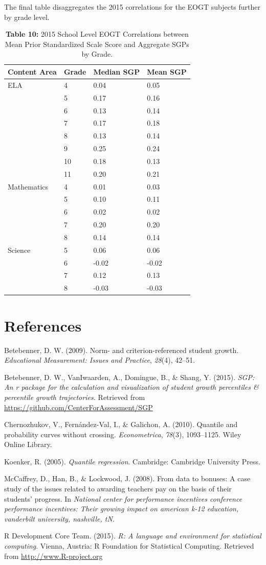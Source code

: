 \documentclass[12pt]{article}
\begin{document}
The final table disaggregates the 2015 correlations for the EOGT
subjects further by grade level.

\begin{table}[H]
\caption*{\textbf{Table 10:} 2015 School Level EOGT Correlations between Mean Prior Standardized Scale Score and Aggregate SGPs by Grade.\label{table10}} 
\begin{center}
\begin{tabular}{llll}
\hline\hline
\multicolumn{1}{c}{Content Area}&\multicolumn{1}{c}{Grade}&\multicolumn{1}{c}{Median SGP}&\multicolumn{1}{c}{Mean SGP}\tabularnewline
\hline
ELA& 4& 0.04& 0.05\tabularnewline
& 5& 0.17& 0.16\tabularnewline
& 6& 0.13& 0.14\tabularnewline
& 7& 0.17& 0.18\tabularnewline
& 8& 0.13& 0.14\tabularnewline
& 9& 0.25& 0.24\tabularnewline
&10& 0.18& 0.13\tabularnewline
&11& 0.20& 0.21\tabularnewline
Mathematics& 4& 0.01& 0.03\tabularnewline
& 5& 0.10& 0.11\tabularnewline
& 6& 0.02& 0.02\tabularnewline
& 7& 0.20& 0.20\tabularnewline
& 8& 0.14& 0.14\tabularnewline
Science& 5& 0.06& 0.06\tabularnewline
& 6&-0.02&-0.02\tabularnewline
& 7& 0.12& 0.13\tabularnewline
& 8&-0.03&-0.03\tabularnewline
\hline
\end{tabular}\end{center}

\end{table}

\pagebreak

\section*{References}\label{references}

Betebenner, D. W. (2009). Norm- and criterion-referenced student growth.
\emph{Educational Measurement: Issues and Practice}, \emph{28}(4),
42--51.

Betebenner, D. W., {VanIwaarden}, A., Domingue, B., \& Shang, Y. (2015).
\emph{SGP: An r package for the calculation and visualization of student
growth percentiles \& percentile growth trajectories.} Retrieved from
\url{https://github.com/CenterForAssessment/SGP}

Chernozhukov, V., Fern{á}ndez-Val, I., \& Galichon, A. (2010). Quantile
and probability curves without crossing. \emph{Econometrica},
\emph{78}(3), 1093--1125. Wiley Online Library.

Koenker, R. (2005). \emph{Quantile regression}. Cambridge: Cambridge
University Press.

McCaffrey, D., Han, B., \& Lockwood, J. (2008). From data to bonuses: A
case study of the issues related to awarding teachers pay on the basis
of their students' progress. In \emph{National center for performance
incentives conference performance incentives: Their growing impact on
american k-12 education, vanderbilt university, nashville, tN}.

R Development Core Team. (2015). \emph{R: A language and environment for
statistical computing}. Vienna, Austria: R Foundation for Statistical
Computing. Retrieved from \url{http://www.R-project.org}



\end{document}
